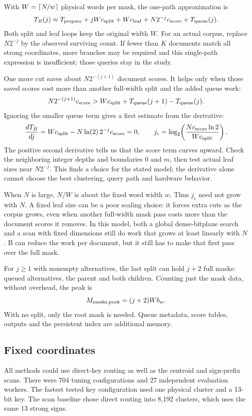 With $W=\left\lceil N/w\right\rceil$ physical words per mask, the one-path approximation is
\begin{equation}
T_B(j)\approx T_{\rm prepare}+jWc_{\rm split}+Wc_{\rm leaf}
                    +N2^{-j}c_{\rm score}+T_{\rm queue}(j).
\label{eq:one-path-time}
\end{equation}
Both split and leaf loops keep the original width $W$. For an actual corpus, replace $N2^{-j}$
by the observed surviving count. If fewer than $K$ documents match all strong coordinates, more branches may
be required and this single-path expression is insufficient; those queries stay in the study.

One more cut saves about $N2^{-(j+1)}$ document scores. It helps only when those saved scores
cost more than another full-width split and the added queue work:
\begin{equation}
N2^{-(j+1)}c_{\rm score}>
 Wc_{\rm split}+T_{\rm queue}(j+1)-T_{\rm queue}(j).
\label{eq:one-more-cut}
\end{equation}
Ignoring the smaller queue term gives a first estimate from the derivative:
\[
\frac{dT_B}{dj}=Wc_{\rm split}-N\ln(2)\,2^{-j}c_{\rm score}=0,
\qquad
j_c=\log_2\!\left(\frac{Nc_{\rm score}\ln 2}{Wc_{\rm split}}\right).
\]
The positive second derivative tells us that the score term curves upward. Check the
neighboring integer depths and boundaries $0$ and $m$, then test actual leaf sizes near
$N2^{-j}$. This finds a choice for the stated model; the derivative alone cannot choose the
best clustering, query path and hardware behavior.

When $N$ is large, $N/W$ is about the fixed word width $w$. Thus $j_c$ need not grow with $N$.
A fixed leaf size can be a poor scaling choice: it forces extra cuts as the corpus grows,
even when another full-width mask pass costs more than the document scores it removes.
In this model, both a global dense-bitplane search and a scan with fixed dimensions still
do work that grows at least linearly with $N$. B can reduce the work per document, but it
still has to make that first pass over the full mask.

For $j\ge1$ with nonempty alternatives, the last split can hold $j+2$ full masks: queued
alternatives, the parent and both children. Counting just the mask data, without overhead, the peak is
\[
M_{\rm masks,peak}=(j+2)Wb_w.
\]
With no split, only the root mask is needed. Queue metadata, score tables, outputs and the
persistent index are additional memory.

\subsection{Fixed coordinates}
All methods could use direct-key routing as well as the centroid and sign-prefix scans.
There were 704 tuning configurations and 27 independent evaluation workers. The fastest tested
key configuration used one physical cluster and a 13-bit key. The scan baseline chose direct
routing into 8,192 clusters, which uses the same 13 strong signs.

